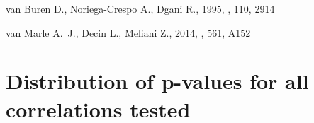 \documentclass[useAMS, usenatbib, a4paper]{mnras}
\begin{document}
\begin{thebibliography}{}
{van Buren} D.,  {Noriega-Crespo} A.,   {Dgani} R.,  1995, \aj, 110, 2914

{van Marle} A.~J.,  {Decin} L.,   {Meliani} Z.,  2014, \aap, 561, A152

\makeatother
\end{thebibliography}
 
\appendix

\section{Distribution of p-values for all correlations tested}
\label{sec:distr-p-values}
\end{document}
